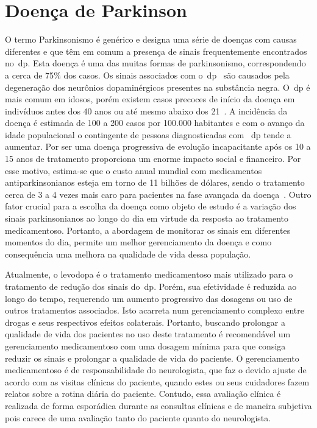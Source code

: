 \section{Doença de Parkinson}\label{section:doenca_parkinson}
O termo Parkinsonismo é genérico e designa uma série de doenças com causas diferentes e que têm em comum a presença de sinais frequentemente encontrados no~\ac{dp}. Esta doença é uma das muitas formas de parkinsonismo, correspondendo a cerca de 75$\%$ dos casos. Os sinais associados com o~\ac{dp}~\cite{protpar010} são causados pela degeneração dos neurônios dopaminérgicos presentes na substância negra. O~\ac{dp} é mais comum em idosos, porém existem casos precoces de início da doença em indivíduos antes dos 40 anos ou até mesmo abaixo dos 21~\cite{menezes2003}. A incidência da doença é estimada de 100 a 200 casos por 100.000 habitantes e com o avanço da idade populacional o contingente de pessoas diagnosticadas com ~\ac{dp} tende a aumentar. Por ser uma doença progressiva de evolução incapacitante após os 10 a 15 anos de tratamento proporciona um enorme impacto social e financeiro. Por esse motivo, estima-se que o custo anual mundial com medicamentos antiparkinsonianos esteja em torno de 11 bilhões de 
dólares, sendo o tratamento cerca de 3 a 4 vezes mais caro para pacientes na fase avançada da doença~\cite{protpar010}. Outro fator crucial para a escolha da doença como objeto de estudo é a variação dos sinais parkinsonianos ao longo do dia em virtude da resposta ao tratamento medicamentoso. Portanto, a abordagem de monitorar os sinais em diferentes momentos do dia, permite um melhor gerenciamento da doença e como consequência uma melhora na qualidade de vida dessa população.


Atualmente, o levodopa é o tratamento medicamentoso mais utilizado para o tratamento de redução dos sinais do~\ac{dp}. Porém, sua efetividade é reduzida ao longo do tempo, requerendo um aumento progressivo das dosagens ou uso de outros tratamentos associados. Isto acarreta num gerenciamento complexo entre drogas e seus respectivos efeitos colaterais. Portanto, buscando prolongar a qualidade de vida dos pacientes no uso deste tratamento é recomendável um gerenciamento medicamentoso com uma dosagem mínima para que consiga reduzir os sinais e prolongar a qualidade de vida do paciente. O gerenciamento medicamentoso é de responsabilidade do neurologista, que faz o devido ajuste de acordo com as visitas clínicas do paciente, quando estes ou seus cuidadores fazem relatos sobre a rotina diária do paciente. Contudo, essa avaliação clínica é realizada de forma esporádica durante as consultas clínicas e de maneira subjetiva pois carece de uma avaliação tanto do paciente quanto do neurologista. 

